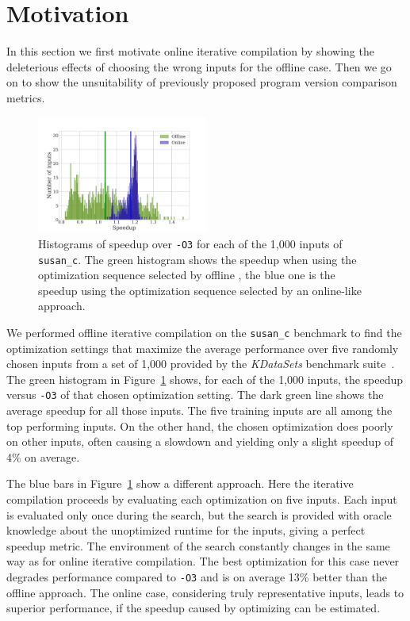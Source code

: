 \section{Motivation}

    In this section we first motivate online iterative compilation by showing the deleterious effects of choosing the wrong inputs for the
    offline case. Then we go on to show the unsuitability of previously proposed program version comparison metrics.

    \begin{figure}[t!]
        \centering
        \includegraphics[width=0.5\textwidth]{figs/motivation-online.pdf}
        \caption{
            Histograms of speedup over \texttt{-O3} for each of the 1,000 inputs of \texttt{susan\_c}. The green histogram shows the
            speedup when using the optimization sequence selected by offline \itercomp, the blue one is the speedup using the optimization
            sequence selected by an online-like approach.
        }
        \label{fig:motivation-online}
    \end{figure}

    We performed offline iterative compilation on the \texttt{susan\_c} benchmark to find the optimization settings that maximize the average performance
    over five randomly chosen inputs from a set of 1,000 provided by the \textit{KDataSets} benchmark suite~\cite{chen10,chen12a}.
    The green histogram in Figure~\ref{fig:motivation-online} shows, for each of the 1,000 inputs, the speedup versus \texttt{-O3} of that
    chosen optimization setting. The dark green line shows the average speedup for all those inputs. The five training inputs are
    all among the top performing inputs. On the other hand, the chosen optimization does poorly on other inputs, often causing
    a slowdown and yielding only a slight speedup of 4\% on average.

    The blue bars in Figure~\ref{fig:motivation-online} show a different approach. Here the iterative compilation proceeds by evaluating
    each optimization on five inputs. Each input is evaluated only once during the search, but the search is provided with oracle
    knowledge about the unoptimized runtime for the inputs, giving a perfect speedup metric. The environment of the search constantly
    changes in the same way as for online iterative compilation. The best optimization for this case never degrades performance compared to
    \texttt{-O3} and is on average 13\% better than the offline approach. The online case, considering truly representative inputs, leads
    to superior performance, if the speedup caused by optimizing can be estimated.

